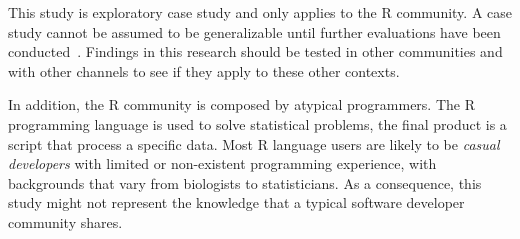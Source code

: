 \documentclass{sig-alternate-05-2015}
\begin{document}
	This study is exploratory case study and only applies to the R community.
	A case study cannot be assumed to be generalizable until further evaluations have been conducted~\cite{Yin2009}.
	Findings in this research should be tested in other communities and with other channels to see if they apply to these other contexts.

    In addition, the R community is composed by atypical programmers.
    The R programming language is used to solve statistical problems, the final product is a script that process a specific data.
    Most R language users are likely to be \textit{casual developers} with limited or non-existent programming experience, with backgrounds that vary from biologists to statisticians.
	As a consequence, this study might not represent the knowledge that a typical software developer community shares.




\end{document}
